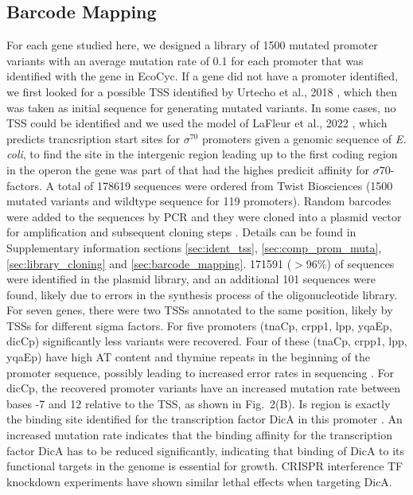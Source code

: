 \subsection{Barcode Mapping}
For each gene studied here, we designed a library of 1500 mutated promoter variants with an average mutation rate of 0.1 for each promoter that was identified with the gene in EcoCyc. If a gene did not have a promoter identified, we first looked for a possible TSS identified by Urtecho et al., 2018 \cite{urtecho2018systematic}, which then was taken as initial sequence for generating mutated variants. In some cases, no TSS could be identified and we used the model of LaFleur et al., 2022 \cite{lafleur2022automated}, which predicts trancsription start sites for $\sigma^{70}$ promoters given a genomic sequence of \textit{E. coli}, to find the site in the intergenic region leading up to the first coding region in the operon the gene was part of that had the highes predicit affinity for $\sigma70$-factors. A total of 178619 sequences were ordered from Twist Biosciences (1500 mutated variants and wildtype sequence for 119 promoters). Random barcodes were added to the sequences by PCR and they were cloned into a plasmid vector for amplification and subsequent cloning steps . Details can be found in Supplementary information sections \ref{sec:ident_tss}, \ref{sec:comp_prom_muta}, \ref{sec:library_cloning} and  \ref{sec:barcode_mapping}. 171591 ($>$96\%) of sequences were identified in the plasmid library, and an additional 101 sequences were found, likely due to errors in the synthesis process of the oligonucleotide library. For seven genes, there were two TSSs annotated to the same position, likely by TSSs for different sigma factors. For five promoters (tnaCp, crpp1, lpp, yqaEp, dicCp) significantly less variants were recovered. Four of these (tnaCp, crpp1, lpp, yqaEp) have high AT content and thymine repeats in the beginning of the promoter sequence, possibly leading to increased error rates in sequencing .
For dicCp, the recovered promoter variants have an increased mutation rate between bases -7 and 12 relative to the TSS, as shown in Fig.~2(B). Is region is exactly the binding site identified for the transcription factor DicA in this promoter \cite{yun2012cnuk9e}. An increased mutation rate indicates that the binding affinity for the transcription factor DicA has to be reduced significantly, indicating that binding of DicA to its functional targets in the genome is essential for growth. CRISPR interference TF knockdown experiments have shown similar lethal effects when targeting DicA\cite{han2023genome}.


